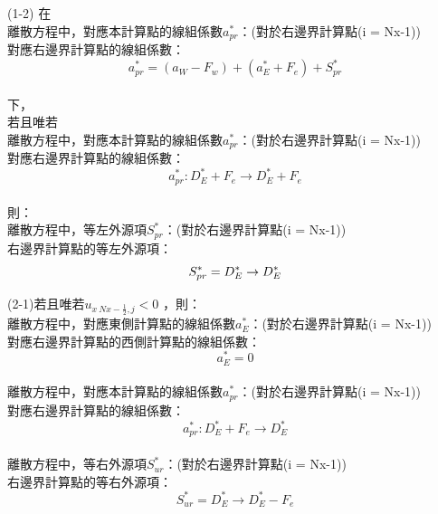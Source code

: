 \documentclass[12pt]{article}
\begin{document}
\noindent (1-2)
        在\\
        離散方程中，對應本計算點的線組係數$a_{pr}^{*}$：(對於右邊界計算點(i = Nx-1))\\
        對應右邊界計算點的線組係數：\\
        $$a_{pr}^{*} = (a_{W}-F_{w}) + (a_{E}^{*} + F_{e}) + S_{pr}^{*}$$\\
        下，\\
        若且唯若\\
        離散方程中，對應本計算點的線組係數$a_{pr}^{*}$：(對於右邊界計算點(i = Nx-1))\\
        對應右邊界計算點的線組係數：\\
        $$a_{pr}^{*} : D_{E}^{*} + F_{e} \rightarrow D_{E}^{*} + F_{e}$$\\
        則：\\
        離散方程中，等左外源項$S_{pr}^{*}$：(對於右邊界計算點(i = Nx-1))\\
        右邊界計算點的等左外源項：\\
        \begin{equation}
        S_{pr}^{*} = D_{E}^{*} \rightarrow D_{E}^{*}\\
        \end{equation}


\noindent (2-1)若且唯若$u_{x\ Nx-\frac{1}{2} ,j} < 0$ ，則：\\
離散方程中，對應東側計算點的線組係數$a_{E}^{*}$：(對於右邊界計算點(i = Nx-1))\\
對應右邊界計算點的西側計算點的線組係數：\\
$$a_{E}^{*} = 0$$\\
離散方程中，對應本計算點的線組係數$a_{pr}^{*}$：(對於右邊界計算點(i = Nx-1))\\
對應右邊界計算點的線組係數：\\
$$a_{pr}^{*} : D_{E}^{*} + F_{e} \rightarrow D_{E}^{*} $$\\
離散方程中，等右外源項$S_{ur}^{*}$：(對於右邊界計算點(i = Nx-1))\\
右邊界計算點的等右外源項：\\
$$S_{ur}^{*} = D_{E}^{*} \rightarrow D_{E}^{*} - F_{e} $$\\
\end{document}
